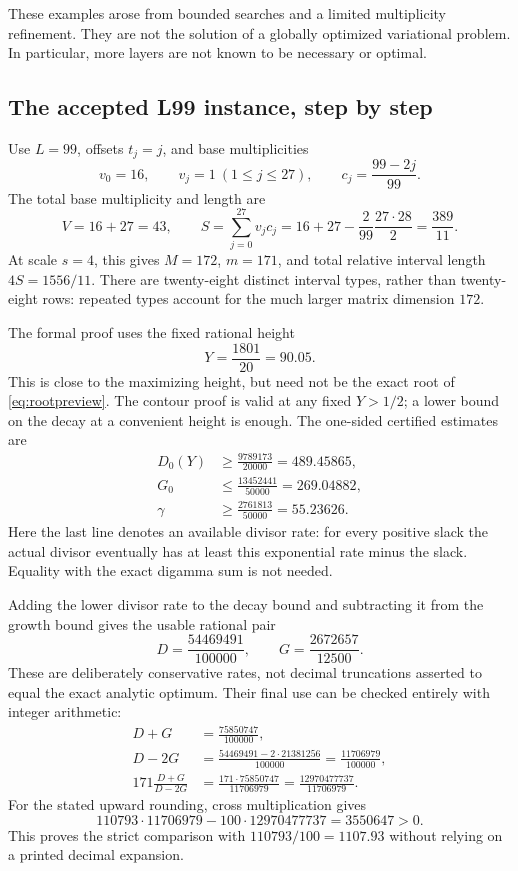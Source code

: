 These examples arose from bounded searches and a limited multiplicity
refinement. They are not the solution of a globally optimized
variational problem. In particular, more layers are not known to be
necessary or optimal.

\subsection{The accepted L99 instance, step by step}
\label{subsec:l99}

Use \(L=99\), offsets \(t_j=j\), and base multiplicities
\[
v_0=16,\qquad v_j=1\ (1\le j\le27),\qquad
c_j=\frac{99-2j}{99}.
\]
The total base multiplicity and length are
\[
V=16+27=43,\qquad
S=\sum_{j=0}^{27}v_jc_j
 =16+27-\frac{2}{99}\frac{27\cdot28}{2}
 =\frac{389}{11}.
\]
At scale \(s=4\), this gives \(M=172\), \(m=171\), and total
relative interval length \(4S=1556/11\). There are twenty-eight
distinct interval types, rather than twenty-eight rows: repeated
types account for the much larger matrix dimension \(172\).

The formal proof uses the fixed rational height
\[
Y=\frac{1801}{20}=90.05.
\]
This is close to the maximizing height, but need not be the exact
root of \eqref{eq:rootpreview}. The contour proof is valid at any
fixed \(Y>1/2\); a lower bound on the decay at a convenient height
is enough. The one-sided certified estimates are
\begin{align*}
D_0(Y)&\ge\frac{9789173}{20000}=489.45865,\\
G_0&\le\frac{13452441}{50000}=269.04882,\\
\gamma&\ge\frac{2761813}{50000}=55.23626.
\end{align*}
Here the last line denotes an available divisor rate: for every
positive slack the actual divisor eventually has at least this
exponential rate minus the slack. Equality with the exact digamma
sum is not needed.

Adding the lower divisor rate to the decay bound and subtracting
it from the growth bound gives the usable rational pair
\[
D=\frac{54469491}{100000},\qquad
G=\frac{2672657}{12500}.
\]
These are deliberately conservative rates, not decimal truncations
asserted to equal the exact analytic optimum. Their final use can
be checked entirely with integer arithmetic:
\begin{align*}
D+G&=\frac{75850747}{100000},\\
D-2G&=\frac{54469491-2\cdot21381256}{100000}
      =\frac{11706979}{100000},\\
171\frac{D+G}{D-2G}
 &=\frac{171\cdot75850747}{11706979}
  =\frac{12970477737}{11706979}.
\end{align*}
For the stated upward rounding, cross multiplication gives
\[
110793\cdot11706979-100\cdot12970477737=3550647>0.
\]
This proves the strict comparison with \(110793/100=1107.93\)
without relying on a printed decimal expansion.

